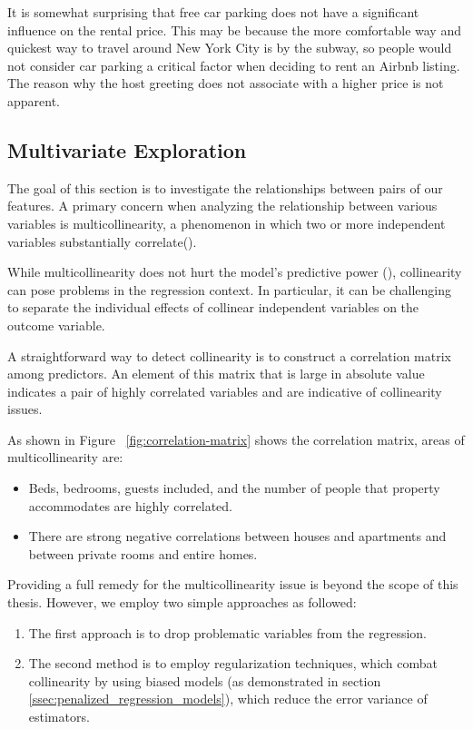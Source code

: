 It is somewhat surprising that free car parking does not have a significant
influence on the rental price. This may be because the more comfortable way and
quickest way to travel around New York City is by the subway, so people would
not consider car parking a critical factor when deciding to rent an Airbnb
listing. The reason why the host greeting does not associate with a higher price
is not apparent.

\subsection{Multivariate Exploration}
\label{sec:multivariate-exploration}

The goal of this section is to investigate the relationships between pairs of
our features. A primary concern when analyzing the relationship between various
variables is multicollinearity, a phenomenon in which two or more independent
variables substantially correlate(\textcite{cohen2013applied}).

While multicollinearity does not hurt the model's predictive
power (\textcite{kutner2005applied}), collinearity can pose problems in the
regression context. In particular,  it can be challenging to separate the
individual effects of collinear independent variables on the outcome variable.

A straightforward way to detect collinearity is to construct a correlation
matrix among predictors.  An element of this matrix that is large in absolute
value indicates a pair of highly correlated variables and are indicative of
collinearity issues.


As shown in Figure ~\ref{fig:correlation-matrix} shows the correlation matrix,
areas of multicollinearity are:
\begin{itemize}
    \item Beds, bedrooms, guests included, and the number of people that
      property accommodates are highly correlated.
    \item There are strong negative correlations between houses and apartments
        and between private rooms and entire homes.
\end{itemize}

Providing a full remedy for the multicollinearity issue is beyond the scope of
this thesis. However, we employ two  simple approaches as followed:

\begin{enumerate}
    \item The first approach is to drop problematic variables from the regression.
    \item The second method is to employ regularization techniques, which combat
        collinearity by using biased models (as demonstrated in section \ref{ssec:penalized_regression_models}),
        which reduce the error variance of estimators.
\end{enumerate}


